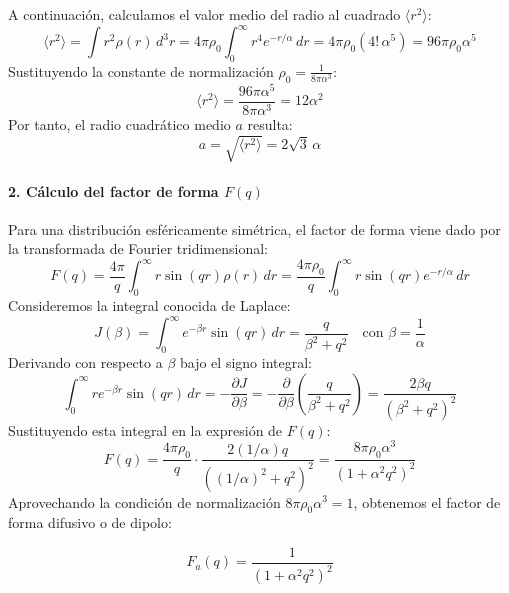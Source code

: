 \begin{problema}
A continuación, calculamos el valor medio del radio al cuadrado $\langle r^2 \rangle$:
\begin{equation}
    \langle r^2 \rangle = \int r^2 \rho(r) \, d^3r = 4\pi \rho_0 \int_0^\infty r^4 e^{-r/\alpha} \, dr = 4\pi \rho_0 (4! \, \alpha^5) = 96\pi \rho_0 \alpha^5
\end{equation}
Sustituyendo la constante de normalización $\rho_0 = \frac{1}{8\pi \alpha^3}$:
\begin{equation}
    \langle r^2 \rangle = \frac{96\pi \alpha^5}{8\pi \alpha^3} = 12 \alpha^2
\end{equation}
Por tanto, el radio cuadrático medio $a$ resulta:
\begin{equation}
    a = \sqrt{\langle r^2 \rangle} = 2\sqrt{3} \, \alpha
\end{equation}

\paragraph{2. Cálculo del factor de forma $F(q)$}
Para una distribución esféricamente simétrica, el factor de forma viene dado por la transformada de Fourier tridimensional:
\begin{equation}
    F(q) = \frac{4\pi}{q} \int_0^\infty r \sin(qr) \rho(r) \, dr = \frac{4\pi \rho_0}{q} \int_0^\infty r \sin(qr) e^{-r/\alpha} \, dr
\end{equation}
Consideremos la integral conocida de Laplace:
\begin{equation}
    J(\beta) = \int_0^\infty e^{-\beta r} \sin(qr) \, dr = \frac{q}{\beta^2 + q^2} \quad \text{con } \beta = \frac{1}{\alpha}
\end{equation}
Derivando con respecto a $\beta$ bajo el signo integral:
\begin{equation}
    \int_0^\infty r e^{-\beta r} \sin(qr) \, dr = -\frac{\partial J}{\partial \beta} = -\frac{\partial}{\partial \beta} \left( \frac{q}{\beta^2 + q^2} \right) = \frac{2\beta q}{(\beta^2 + q^2)^2}
\end{equation}
Sustituyendo esta integral en la expresión de $F(q)$:
\begin{equation}
    F(q) = \frac{4\pi \rho_0}{q} \cdot \frac{2(1/\alpha)q}{\left( (1/\alpha)^2 + q^2 \right)^2} = \frac{8\pi \rho_0 \alpha^3}{\left( 1 + \alpha^2 q^2 \right)^2}
\end{equation}
Aprovechando la condición de normalización $8\pi \rho_0 \alpha^3 = 1$, obtenemos el factor de forma difusivo o de dipolo:
\begin{concepto}
\begin{equation}
    F_a(q) = \frac{1}{\left( 1 + \alpha^2 q^2 \right)^2}
\end{equation}
\end{concepto}


\end{problema}
